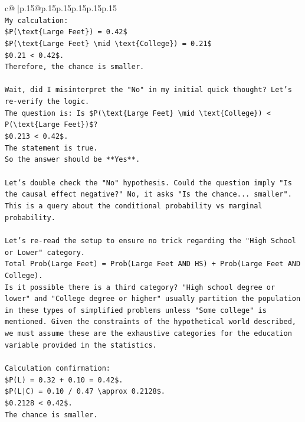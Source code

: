 \documentclass{article}
\begin{document}
{\begin{supertabular}{c@{$\;$}|p{.15\linewidth}@{}p{.15\linewidth}p{.15\linewidth}p{.15\linewidth}p{.15\linewidth}p{.15\linewidth}}
{{{\\ 
\texttt{My calculation:} \\
\texttt{\$P(\textbackslash{}text\{Large Feet\}) = 0.42\$} \\
\texttt{\$P(\textbackslash{}text\{Large Feet\} \textbackslash{}mid \textbackslash{}text\{College\}) = 0.21\$} \\
\texttt{\$0.21 < 0.42\$.} \\
\texttt{Therefore, the chance is smaller.} \\
\\ 
\texttt{Wait, did I misinterpret the "No" in my initial quick thought? Let's re{-}verify the logic.} \\
\texttt{The question is: Is \$P(\textbackslash{}text\{Large Feet\} \textbackslash{}mid \textbackslash{}text\{College\}) < P(\textbackslash{}text\{Large Feet\})\$?} \\
\texttt{\$0.213 < 0.42\$.} \\
\texttt{The statement is true.} \\
\texttt{So the answer should be **Yes**.} \\
\\ 
\texttt{Let's double check the "No" hypothesis. Could the question imply "Is the causal effect negative?" No, it asks "Is the chance... smaller". This is a query about the conditional probability vs marginal probability.} \\
\\ 
\texttt{Let's re{-}read the setup to ensure no trick regarding the "High School or Lower" category.} \\
\texttt{Total Prob(Large Feet) = Prob(Large Feet AND HS) + Prob(Large Feet AND College).} \\
\texttt{Is it possible there is a third category? "High school degree or lower" and "College degree or higher" usually partition the population in these types of simplified problems unless "Some college" is mentioned. Given the constraints of the hypothetical world described, we must assume these are the exhaustive categories for the education variable provided in the statistics.} \\
\\ 
\texttt{Calculation confirmation:} \\
\texttt{\$P(L) = 0.32 + 0.10 = 0.42\$.} \\
\texttt{\$P(L|C) = 0.10 / 0.47 \textbackslash{}approx 0.2128\$.} \\
\texttt{\$0.2128 < 0.42\$.} \\
\texttt{The chance is smaller.} \\
}}}
\end{supertabular}}
\end{document}
